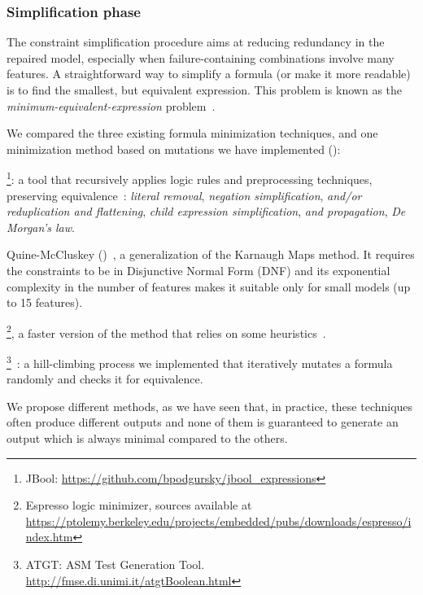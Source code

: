 \begin{tikzborder}{\cite{Gargantini16:validation}}
\begin{tikzborder}{\cite{gargantini_combinatorial_2017}}
\begin{tikzborder}{\cite{gargantini_combinatorial_2017}}
\begin{tikzborder}{\cite{garn2019}}
\begin{tikzborder}{\cite{arcaini2019achieving}}
\begin{tikzborder}{\cite{arcaini2019varivolution}}
		\subsubsection{\textsf{Simplification} phase}\label{sec:simplification}
		\bb The constraint \textsf{simplification} procedure aims at reducing redundancy in the repaired model, especially when failure-containing combinations involve many features. A straightforward way to simplify a formula (or make it more readable) is to find the smallest, but equivalent expression. This problem is known as the \textit{minimum-equivalent-expression} problem~\cite{Buchfuhrer:2011:CBF:1889388.1889508, hemaspaandra_minimization_2011}.
		
		We compared the three existing formula minimization techniques, and one minimization method based on mutations we have implemented (\atgt):
		\begin{compactenum}
			\item \jbool\footnote{JBool: \url{https://github.com/bpodgursky/jbool_expressions}}: a tool that recursively applies logic rules and preprocessing techniques, preserving equivalence~\cite{Biere2012}: \textit{literal removal}, \textit{negation simplification}, \textit{and/or reduplication and flattening}, \textit{child expression simplification}, \textit{and propagation}, \textit{De Morgan's law}.
			\item \textsf{Quine-McCluskey} (\qm)~\cite{Quine3}, a generalization of the Karnaugh Maps method. It requires the constraints to be in Disjunctive Normal Form (DNF) and its exponential complexity in the number of features makes it suitable only for small models (up to 15 features).
			\item \espresso\footnote{Espresso logic minimizer, sources available at \url{https://ptolemy.berkeley.edu/projects/embedded/pubs/downloads/espresso/index.htm}}, a faster version of the \qm method that relies on some heuristics~\cite{Rudell:M86/65}.
			\item \atgt\footnote{ATGT: ASM Test Generation Tool. \url{http://fmse.di.unimi.it/atgtBoolean.html}}~\cite{CalvagnaG09}: a hill-climbing process we implemented that iteratively mutates a formula randomly and checks it for equivalence. %
		\end{compactenum}
		
		We propose different methods, as we have seen that, in practice, these techniques often produce different outputs and none of them is guaranteed to generate an output which is always minimal compared to the others.\be
		

\end{tikzborder}
\end{tikzborder}
\end{tikzborder}
\end{tikzborder}
\end{tikzborder}
\end{tikzborder}
